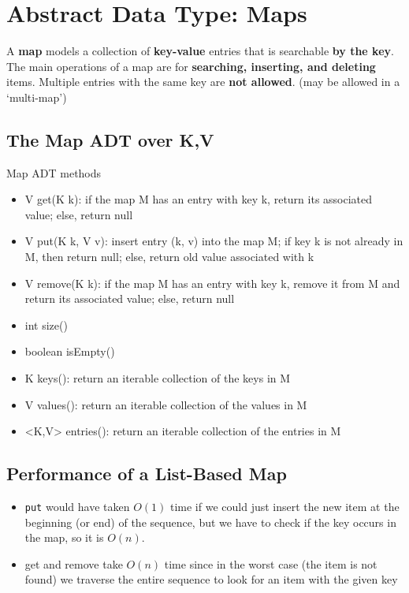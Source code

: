\documentclass{article}
\begin{document}
\section{Abstract Data Type: Maps}
\begin{flushleft}
A \textbf{map} models a collection of \textbf{key-value} entries that is searchable \textbf{by the key}. The main operations of a map are for \textbf{searching, inserting, and deleting} items. Multiple entries with the same key are \textbf{not allowed}. (may be allowed in a ‘multi-map’)
\end{flushleft}

\subsection{The Map ADT over K,V}
\begin{flushleft}
Map ADT methods
\begin{itemize}
	\item V get(K k): if the map M has an entry with key k, return its associated value; else, return null
	\item V put(K k, V v): insert entry (k, v) into the map M; if key k is not already in M, then return null; else, return old value associated with k
	\item V remove(K k): if the map M has an entry with key k, remove it from M and return its associated value; else, return null
	\item int size()
	\item boolean isEmpty()
	\item {K} keys(): return an iterable collection of the keys in M
	\item {V} values(): return an iterable collection of the values in M
	\item {<K,V>} entries(): return an iterable collection of the entries in M
\end{itemize}
\end{flushleft}

\subsection{Performance of a List-Based Map}
\begin{itemize}
	\item \texttt{put} would have taken $O(1)$ time if we could just insert the new item at the beginning (or end) of the sequence, but we have to check if the key occurs in the map, so it is $O(n)$.
	\item get and remove take $O(n)$ time since in the worst case (the item is not found) we traverse the entire sequence to look for an item with the given key
\end{itemize}
\end{document}

